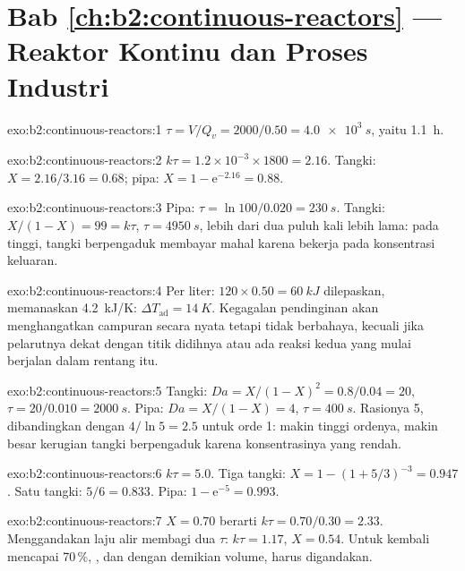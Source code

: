 \section*{Bab \ref{ch:b2:continuous-reactors} --- Reaktor Kontinu dan Proses Industri}

\begin{solution}{exo:b2:continuous-reactors:1}
$\tau = V/Q_v = 2000/0.50 = \qty{4.0e3}{s}$, yaitu \qty{1.1}{h}.
\end{solution}

\begin{solution}{exo:b2:continuous-reactors:2}
$k\tau = 1.2 \times 10^{-3} \times 1800 = 2.16$. Tangki: $X = 2.16/3.16 = 0.68$;
pipa: $X = 1 - \mathrm e^{-2.16} = 0.88$.
\end{solution}

\begin{solution}{exo:b2:continuous-reactors:3}
Pipa: $\tau = \ln 100/0.020 = \qty{230}{s}$. Tangki: $X/(1 - X) = 99 = k\tau$,
$\tau = \qty{4950}{s}$, lebih dari dua puluh kali lebih lama: pada 
tinggi, tangki berpengaduk membayar mahal karena bekerja pada konsentrasi
keluaran.
\end{solution}

\begin{solution}{exo:b2:continuous-reactors:4}
Per liter: $120 \times 0.50 = \qty{60}{kJ}$ dilepaskan, memanaskan
\qty{4.2}{kJ/K}: $\Delta T_{\text{ad}} = \qty{14}{K}$. Kegagalan pendinginan
akan menghangatkan campuran secara nyata tetapi tidak berbahaya, kecuali
jika pelarutnya dekat dengan titik didihnya atau ada reaksi kedua yang
mulai berjalan dalam rentang itu.
\end{solution}

\begin{solution}{exo:b2:continuous-reactors:5}
Tangki: $Da = X/(1 - X)^2 = 0.8/0.04 = 20$, $\tau = 20/0.010 = \qty{2000}{s}$.
Pipa: $Da = X/(1 - X) = 4$, $\tau = \qty{400}{s}$. Rasionya 5, dibandingkan
dengan $4/\ln 5 =
2.5$ untuk orde 1: makin tinggi ordenya, makin besar
kerugian tangki berpengaduk karena konsentrasinya yang rendah.
\end{solution}

\begin{solution}{exo:b2:continuous-reactors:6}
$k\tau = 5.0$. Tiga tangki: $X = 1 - (1 + 5/3)^{-3} = 0.947$. Satu tangki:
$5/6 =
0.833$. Pipa: $1 - \mathrm e^{-5} = 0.993$.
\end{solution}

\begin{solution}{exo:b2:continuous-reactors:7}
$X = 0.70$ berarti $k\tau = 0.70/0.30 = 2.33$. Menggandakan laju alir
membagi dua $\tau$: $k\tau = 1.17$, $X = 0.54$. Untuk kembali mencapai
70\,\%, , dan dengan demikian volume, harus digandakan.
\end{solution}

